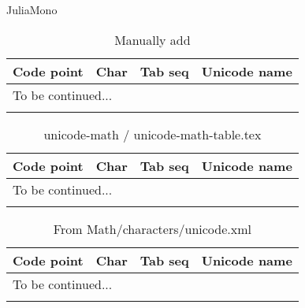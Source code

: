 \documentclass[a4paper]{article}
\newcommand\mainMathFontName{JuliaMono}
\begin{document}
{\Large \mainMathFontName}

\begin{longtable}{ccll}
  \caption{Manually add} \\
  \toprule
  Code point & Char & Tab seq & Unicode name \\
  \hline \endhead
  \multicolumn{4}{l}{To be continued...} \\ 
  \midrule \endfoot
  \bottomrule \endlastfoot

  

  \\ \bottomrule
\end{longtable}

\cleardoublepage

\begin{longtable}{ccll}
  \caption{unicode-math / unicode-math-table.tex} \\
  \toprule
  Code point & Char & Tab seq & Unicode name \\
  \hline \endhead
  \multicolumn{4}{l}{To be continued...} \\ 
  \midrule \endfoot
  \bottomrule \endlastfoot

  

  \\ \bottomrule
\end{longtable}

\cleardoublepage

\begin{longtable}{ccll}
  \caption{From Math/characters/unicode.xml} \\
  \toprule
  Code point & Char & Tab seq & Unicode name \\
  \hline \endhead
  \multicolumn{4}{l}{To be continued...} \\ 
  \midrule \endfoot
  \bottomrule \endlastfoot

  

  \\ \bottomrule
\end{longtable}
\end{document}
